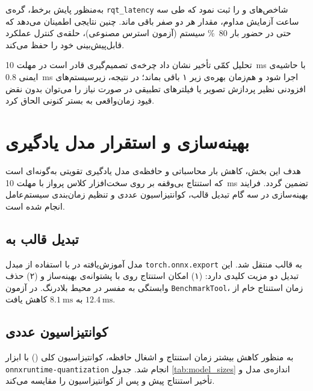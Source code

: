 	به‌منظور پایش برخط، گره‌ی \texttt{rqt\_latency} شاخص‌های و را ثبت نمود که طی سه ساعت آزمایش مداوم، مقدار هر دو صفر باقی ماند. چنین نتایجی اطمینان می‌دهد که حتی در حضور بار \SI{80}{\percent} سیستم (آزمون استرس مصنوعی)، حلقه‌ی کنترل عملکرد قابل‌پیش‌بینی خود را حفظ می‌کند.
	
	تحلیل کمّی تأخیر نشان داد چرخه‌ی تصمیم‌گیری قادر است در مهلت \SI{10}{\milli\second} با حاشیه‌ی ایمنی \SI{0.8}{\milli\second} اجرا شود و هم‌زمان بهره‌ی  زیر ۱ باقی بماند؛ در نتیجه، زیرسیستم‌های افزودنی نظیر پردازش تصویر یا فیلترهای تطبیقی در صورت نیاز را می‌توان بدون نقض قیود زمان‌واقعی به بستر کنونی الحاق کرد.
	
	
	\section{بهینه‌سازی و استقرار مدل یادگیری}\label{sec:hil_deployment}
	
	هدف این بخش، کاهش بار محاسباتی و حافظه‌ی مدل یادگیری تقویتی به‌گونه‌ای است که استنتاج بی‌وقفه بر روی سخت‌افزار کلاس پرواز  با مهلت \SI{10}{\milli\second} تضمین گردد. فرایند بهینه‌سازی در سه گام تبدیل قالب، کوانتیزاسیون عددی و تنظیم زمان‌بندی سیستم‌عامل انجام شده است.
	
	\subsection{تبدیل قالب
		 	به
		 }
	مدل آموزش‌یافته در  با استفاده از مبدل \texttt{torch.onnx.export} به قالب  منتقل شد. این تبدیل دو مزیت کلیدی دارد:  
	(۱) امکان استنتاج روی  با پشتوانه‌ی بهینه‌ساز 
	 و  
	(۲) حذف وابستگی به مفسر  در محیط بلادرنگ.  
	در آزمون \texttt{BenchmarkTool}، زمان استنتاج خام از $\SI{12.4}{\milli\second}$ به $\SI{8.1}{\milli\second}$ کاهش یافت.
	
	\subsection{کوانتیزاسیون عددی }
	به منظور کاهش بیشتر زمان استنتاج و اشغال حافظه، کوانتیزاسیون کلی () با ابزار \texttt{onnxruntime‑quantization} انجام شد. جدول \ref{tab:model_sizes} اندازه‌ی مدل و تأخیر استنتاج پیش و پس از کوانتیزاسیون را مقایسه می‌کند.
	
